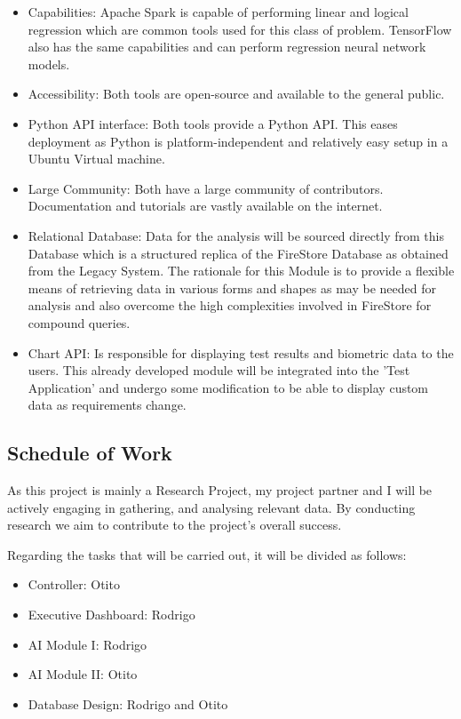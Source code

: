 \documentclass{report}
\begin{document}
\begin{itemize}
    \item {Capabilities}: Apache Spark is capable of performing linear and logical regression\cite{apache_spark} which are common tools used for this class of problem. TensorFlow also has the same capabilities and can perform regression neural network models\cite{tensor_flow}.
    \item {Accessibility}: Both tools are open-source and available to the general public\cite{open_source}.
    \item{Python API interface}: Both tools provide a Python API. This eases deployment as Python is platform-independent and relatively easy setup in a Ubuntu Virtual machine.
    \item{Large Community}: Both have a large community of contributors. Documentation and tutorials are vastly available on the internet.
    \item{Relational Database}: Data for the analysis will be sourced directly from this Database which is a structured replica of the FireStore Database as obtained from the Legacy System. The rationale for this Module is to provide a flexible means of retrieving data in various forms and shapes as may be needed for analysis and also overcome the high complexities involved in FireStore for compound queries.
    \item{Chart API}:
    Is responsible for displaying test results and biometric data to the users. This already developed module will be integrated into the 'Test Application' and undergo some modification to be able to display custom data as requirements change. 
    
\end{itemize}

\subsection*{Schedule of Work}
As this project is mainly a Research Project, my project partner and I will be actively engaging in gathering, and analysing relevant data. By conducting research we aim to contribute to the project's overall success.

Regarding the tasks that will be carried out, it will be divided as follows:

\begin{itemize}
    \item {Controller}: Otito
    \item {Executive Dashboard}: Rodrigo
    \item {AI Module I}: Rodrigo
    \item {AI Module II}: Otito
    \item {Database Design}: Rodrigo and Otito 
\end{itemize}
\end{document}
